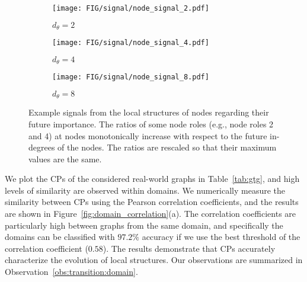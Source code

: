 \begin{figure}[t]
    \vspace{-3mm}
     \centering
     \begin{subfigure}{0.155\textwidth}
         \texttt{[image: FIG/signal/node\_signal\_2.pdf]}
         \caption{$d_\theta = 2$}
     \end{subfigure}
     \begin{subfigure}{0.155\textwidth}
        \texttt{[image: FIG/signal/node\_signal\_4.pdf]}
        \caption{$d_\theta = 4$}
     \end{subfigure}
     \begin{subfigure}{0.155\textwidth}
        \texttt{[image: FIG/signal/node\_signal\_8.pdf]}
        \caption{$d_\theta = 8$}
     \end{subfigure}
     \caption{\label{fig:trend_signal} 
     \label{fig:signal_degree}
     Example signals from the local structures of nodes regarding their future importance. The ratios of some node roles (e.g., node roles 2 and 4) at nodes monotonically increase with respect to the future in-degrees of the nodes. The ratios are rescaled so that their maximum values are the same.}
\end{figure}

We plot the CPs of the considered real-world graphs in Table~\ref{tab:gtg}, and high levels of similarity are observed within domains.
We numerically measure the similarity between CPs using the Pearson correlation coefficients, and the results are shown in Figure~\ref{fig:domain_correlation}(a).
The correlation coefficients are particularly high between graphs from the same domain, and specifically the domains can be classified with $97.2\%$ accuracy if we use the best threshold of the correlation coefficient ($0.58$).
The results demonstrate that CPs accurately characterize the evolution of local structures.
Our observations are summarized in Observation~\ref{obs:transition:domain}.

	

